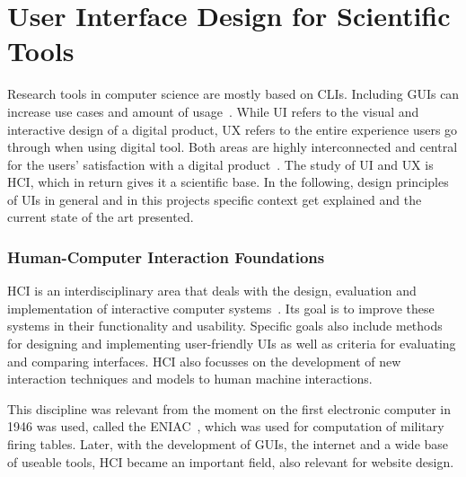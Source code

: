 \section{User Interface Design for Scientific Tools}


Research tools in computer science are mostly based on \acp{CLI}. Including \acp{GUI} can increase use cases and amount of usage~\cite{sampath_accessibility_2021}.
While \ac{UI} refers to the visual and interactive design of a digital product, \ac{UX} refers to the entire experience users go through when using digital tool. Both areas are highly interconnected and central for the users' satisfaction with a digital product~\cite{hamidli_introduction_2023}. %
The study of \ac{UI} and \ac{UX} is \ac{HCI}, which in return gives it a scientific base. 
In the following, design principles of \acp{UI} in general and in this projects specific context get explained and the current state of the art presented.  %


\subsubsection*{Human-Computer Interaction Foundations}

\ac{HCI} is an interdisciplinary area that deals with the design, evaluation and implementation of interactive computer systems~\cite{sinha_human_2010}. Its goal is to improve these systems in their functionality and usability. 
Specific goals also include methods for designing and implementing user-friendly \acp{UI} as well as criteria for evaluating and comparing interfaces. \ac{HCI} also focusses on the development of new interaction techniques and models to human machine interactions. 

This discipline was relevant from the moment on the first electronic computer in 1946 was used, called the \ac{ENIAC}~\cite{goldstine_electronic_1996}, which was used for computation of military firing tables. Later, with the development of \acp{GUI}, the internet and a wide base of useable tools, \ac{HCI} became an important field, also relevant for website design.

